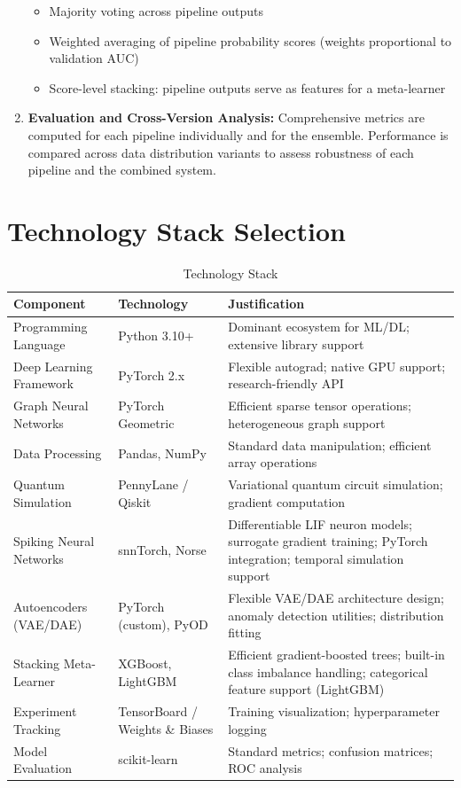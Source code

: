 \begin{enumerate}[label=\arabic*.]
\begin{itemize}
\item Majority voting across pipeline outputs
\item Weighted averaging of pipeline probability scores (weights proportional to validation AUC)
\item Score-level stacking: pipeline outputs serve as features for a meta-learner
\end{itemize}
\item \textbf{Evaluation and Cross-Version Analysis:} Comprehensive metrics are computed for each pipeline individually and for the ensemble. Performance is compared across data distribution variants to assess robustness of each pipeline and the combined system.
\end{enumerate}

\section{Technology Stack Selection}

\begin{table}[H]
\centering
\caption{Technology Stack}
\label{tab:techstack}
\small
\begin{tabularx}{\textwidth}{lLX}
\toprule
\textbf{Component} & \textbf{Technology} & \textbf{Justification} \\
\midrule
Programming Language & Python 3.10+ & Dominant ecosystem for ML/DL; extensive library support \\
Deep Learning Framework & PyTorch 2.x & Flexible autograd; native GPU support; research-friendly API \\
Graph Neural Networks & PyTorch Geometric & Efficient sparse tensor operations; heterogeneous graph support \\
Data Processing & Pandas, NumPy & Standard data manipulation; efficient array operations \\
Quantum Simulation & PennyLane / Qiskit & Variational quantum circuit simulation; gradient computation \\
Spiking Neural Networks & snnTorch, Norse & Differentiable LIF neuron models; surrogate gradient training; PyTorch integration; temporal simulation support \\
Autoencoders (VAE/DAE) & PyTorch (custom), PyOD & Flexible VAE/DAE architecture design; anomaly detection utilities; distribution fitting \\
Stacking Meta-Learner & XGBoost, LightGBM & Efficient gradient-boosted trees; built-in class imbalance handling; categorical feature support (LightGBM) \\
Experiment Tracking & TensorBoard / Weights \& Biases & Training visualization; hyperparameter logging \\
Model Evaluation & scikit-learn & Standard metrics; confusion matrices; ROC analysis \\
\bottomrule
\end{tabularx}
\end{table}

